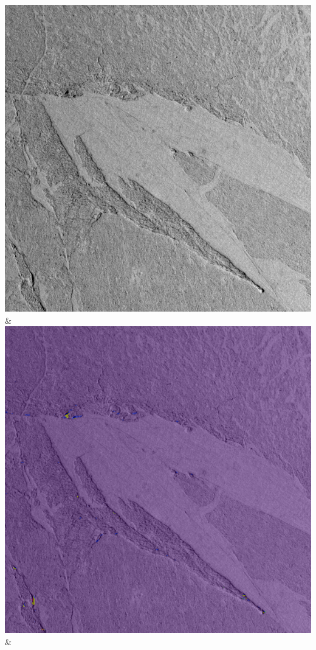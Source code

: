 \begin{table}[h!]
\begin{tabularx}{\textwidth}
		\includegraphics[width=0.9\linewidth]{images/p03/p03_03.png} &
		\includegraphics[width=0.9\linewidth]{images/gen/number_of_segments/p03_03.png_5.png} &

\end{tabularx}
\end{table}
